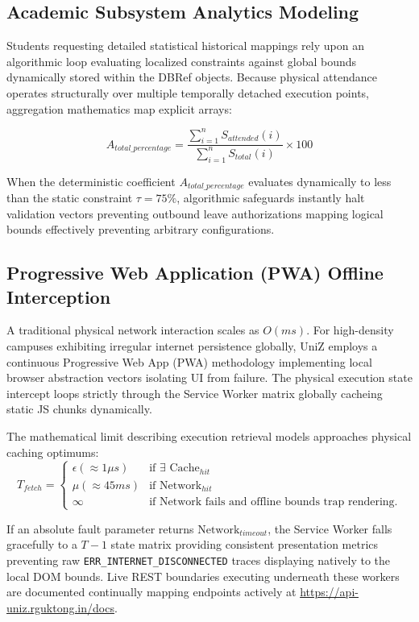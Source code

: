 \documentclass[journal,onecolumn,10pt,draftclsnofoot]{IEEEtran}
\begin{document}
\subsection{Academic Subsystem Analytics Modeling}
Students requesting detailed statistical historical mappings rely upon an algorithmic loop evaluating localized constraints against global bounds dynamically stored within the DBRef objects. Because physical attendance operates structurally over multiple temporally detached execution points, aggregation mathematics map explicit arrays:

\begin{equation}
    A_{total\_percentage} = \frac{\sum_{i=1}^{n} S_{attended}(i)}{\sum_{i=1}^{n} S_{total}(i)} \times 100
\end{equation}

When the deterministic coefficient $A_{total\_percentage}$ evaluates dynamically to less than the static constraint $\tau = 75\%$, algorithmic safeguards instantly halt validation vectors preventing outbound leave authorizations mapping logical bounds effectively preventing arbitrary configurations.

\subsection{Progressive Web Application (PWA) Offline Interception}
A traditional physical network interaction scales as $O(ms)$. For high-density campuses exhibiting irregular internet persistence globally, UniZ employs a continuous Progressive Web App (PWA) methodology implementing local browser abstraction vectors isolating UI from failure. The physical execution state intercept loops strictly through the Service Worker matrix globally cacheing static JS chunks dynamically.

The mathematical limit describing execution retrieval models approaches physical caching optimums:
\begin{equation}
    T_{fetch} = 
    \begin{cases} 
      \epsilon (\approx 1 \mu s) & \text{if } \exists \text{ Cache}_{hit} \\
      \mu (\approx 45 ms) & \text{if } \text{Network}_{hit} \\
      \infty & \text{if Network fails and offline bounds trap rendering.}
    \end{cases}
\end{equation}

If an absolute fault parameter returns $\text{Network}_{timeout}$, the Service Worker falls gracefully to a $T-1$ state matrix providing consistent presentation metrics preventing raw \texttt{ERR\_INTERNET\_DISCONNECTED} traces displaying natively to the local DOM bounds. Live REST boundaries executing underneath these workers are documented continually mapping endpoints actively at \url{https://api-uniz.rguktong.in/docs}.
\end{document}
